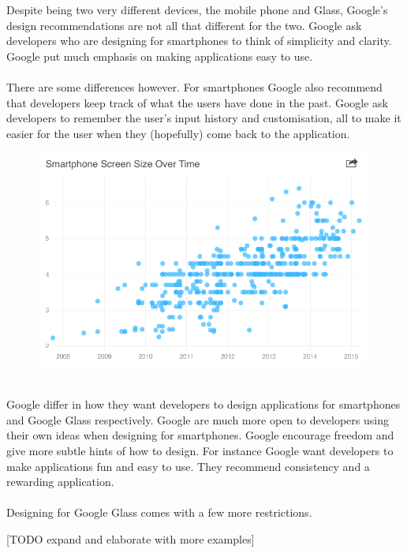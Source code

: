 Despite being two very different devices, the mobile phone and Glass, Google's design recommendations are not all that different for the two. Google ask developers who are designing for smartphones to think of simplicity and clarity. Google put much emphasis on making applications easy to use.
\\
\\
There are some differences however. For smartphones Google also recommend that developers keep track of what the users have done in the past. Google ask developers to remember the user's input history and customisation, all to make it easier for the user when they (hopefully) come back to the application.\cite{androidDesignPrinciples}
\\
	\begin{figure}[ht!]
		\centering
		\includegraphics[width=110mm]{images/smartphoneSize}
		\caption{\cite{smartphoneSizeChart}}
		\label{smartphoneSizeChart}
	\end{figure}
\\
Google differ in how they want developers to design applications for smartphones and Google Glass respectively. Google are much more open to developers using their own ideas when designing for smartphones. Google encourage freedom and give more subtle hints of how to design. For instance Google want developers to make applications fun and easy to use. They recommend consistency and a rewarding application.
\\
\\
Designing for Google Glass comes with a few more restrictions. 

[TODO expand and elaborate with more examples]








